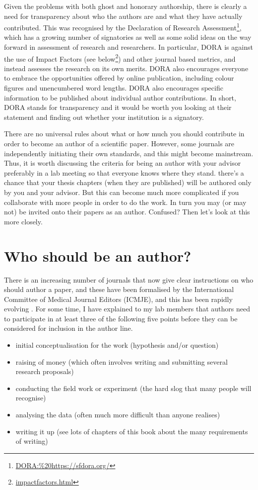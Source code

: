\documentclass[
]{krantz}
\providecommand{\tightlist}{%
  \setlength{\itemsep}{0pt}\setlength{\parskip}{0pt}}
\renewcommand{\href}[2]{#2\footnote{\url{#1}}}
\begin{document}
Given the problems with both ghost and honorary authorship, there is clearly a need for transparency about who the authors are and what they have actually contributed. This was recognised by the \href{DORA:\%20https://sfdora.org/}{Declaration of Research Assessment}, which has a growing number of signatories as well as some solid ideas on the way forward in assessment of research and researchers. In particular, DORA is against the use of Impact Factors (\href{impactfactors.html}{see below}) and other journal based metrics, and instead assesses the research on its own merits. DORA also encourages everyone to embrace the opportunities offered by online publication, including colour figures and unencumbered word lengths. DORA also encourages specific information to be published about individual author contributions. In short, DORA stands for transparency and it would be worth you looking at their statement and finding out whether your institution is a signatory.

There are no universal rules about what or how much you should contribute in order to become an author of a scientific paper. However, some journals are independently initiating their own standards, and this might become mainstream. Thus, it is worth discussing the criteria for being an author with your advisor preferably in a lab meeting so that everyone knows where they stand. there's a chance that your thesis chapters (when they are published) will be authored only by you and your advisor. But this can become much more complicated if you collaborate with more people in order to do the work. In turn you may (or may not) be invited onto their papers as an author. Confused? Then let's look at this more closely.

\hypertarget{who-should-be-an-author}{%
\section{Who should be an author?}\label{who-should-be-an-author}}

There is an increasing number of journals that now give clear instructions on who should author a paper, and these have been formalised by the International Committee of Medical Journal Editors (ICMJE), and this has been rapidly evolving \citep{baskin2011honorary}. For some time, I have explained to my lab members that authors need to participate in at least three of the following five points before they can be considered for inclusion in the author line.

\begin{itemize}
\tightlist
\item
  initial conceptualisation for the work (hypothesis and/or question)
\item
  raising of money (which often involves writing and submitting several research proposals)
\item
  conducting the field work or experiment (the hard slog that many people will recognise)
\item
  analysing the data (often much more difficult than anyone realises)
\item
  writing it up (see lots of chapters of this book about the many requirements of writing)
\end{itemize}
\end{document}
